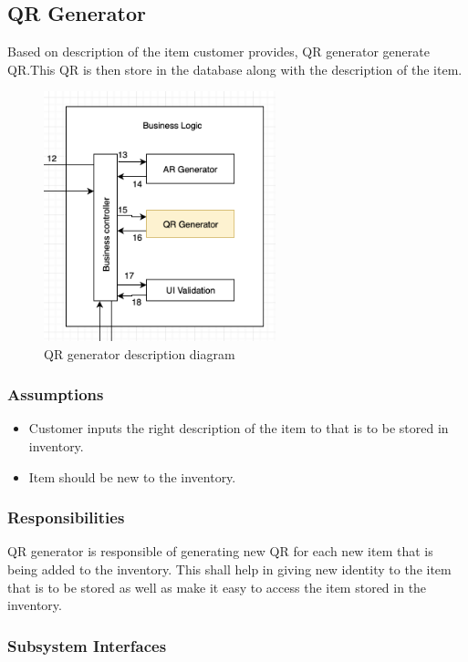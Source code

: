 \subsection{QR Generator}
Based on description of the item customer provides, QR generator generate QR.This QR is then store in the database along with the  description of the item.

\begin{figure}[h!]
	\centering
 	\includegraphics[width=0.60\textwidth]{images/qrgenerator}
 \caption{QR generator description diagram}
\end{figure}

\subsubsection{Assumptions}
\begin{itemize}
    \item Customer inputs the right description of the item to  that is to be stored in inventory.
    \item Item should be new to the inventory.
    
\end{itemize}

\subsubsection{Responsibilities}
QR generator is responsible of generating new QR for each new item that is being added to the inventory. This shall help in giving new identity to the item that is to be stored as well as make it easy to access the item stored in the inventory.

\subsubsection{Subsystem Interfaces}

